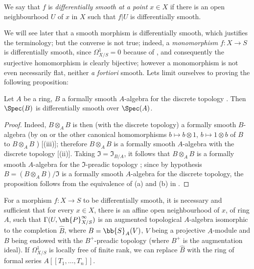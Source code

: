 We say that $f$ is \emph{differentially smooth at a point $x \in X$} if there is an open neighbourhood $U$ of $x$ in $X$ such that $f|U$ is differentially smooth.

We will see later  that a smooth morphism is differentially smooth, which justifies the terminology;
but the converse is not true;
indeed, a \emph{monomorphism} $f:X \to S$ is differentially smooth, since $\Omega^1_{X/S} = 0$ because of , and consequently the surjective homomorphism  is clearly bijective;
however a monomorphism is not even necessarily flat, neither \textit{a fortiori} smooth. 
Lets limit ourselves to proving the following proposition:

\begin{proposition}[16.10.2]
\label{IV.16.10.2}
Let $A$ be a ring, $B$ a formally smooth $A$-algebra for the discrete topology .
Then $\Spec(B)$ is differentially smooth over $\Spec(A)$.
\end{proposition}

\begin{proof}
Indeed, $B \otimes_A B$ is then (with the discrete topology) a formally smooth $B$-algebra (by on or the other canonical homomorphisms $b \mapsto b \otimes 1$, $b \mapsto 1 \otimes b$ of $B$
to $B \otimes_A B$
) [(iii)];
therefore $B \otimes_A B$ is a formally smooth $A$-algebra with the discrete topology [(ii)].
Taking $\mathfrak{I} = \mathfrak{I}_{B/A}$, it follows that $B \otimes_A B$ is a formally smooth $A$-algebra for the $\mathfrak{I}$-preadic topology ;
since by hypothesis $B = (B \otimes_A B)/\mathfrak{I}$ is a formally smooth $A$-algebra for the discrete topology, the proposition follows from the equivalence of (a) and (b) in .
\end{proof}

\begin{proposition}[16.10.3]
\label{IV.16.10.3}
For a morphism $f:X \to S$ to be differentially smooth, it is necessary and sufficient that for every $x \in X$, there is an affine open neighbourhood of $x$, of ring $A$, such that $\Gamma(U, \sh{P}_{X/S}^\infty)$ is an augmented topological $A$-algebra isomorphic to the completion $\widehat{B}$, where $B = \bb{S}_A(V)$, $V$ being a projective $A$-module and $B$ being endowed with the $B^+$-preadic topology (where $B^+$ is the augmentation ideal).
If $\Omega_{X/S}^1$ is locally free of finite rank, we can replace $\widehat{B}$ with the ring of formal series $A[[T_1, \dots, T_n]]$.
\end{proposition}

